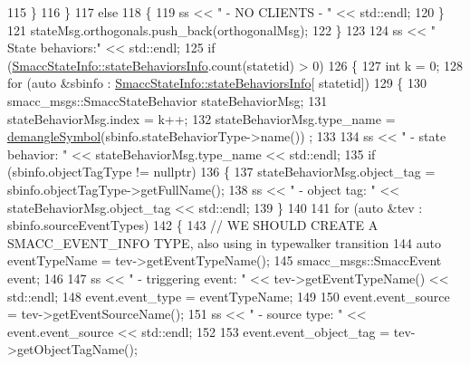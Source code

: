 \begin{DoxyCode}
115                 \}
116             \}
117             \textcolor{keywordflow}{else}
118             \{
119                 ss << \textcolor{stringliteral}{"          - NO CLIENTS - "} << std::endl;
120             \}
121             stateMsg.orthogonals.push\_back(orthogonalMsg);
122         \}
123 
124         ss << \textcolor{stringliteral}{" State behaviors:"} << std::endl;
125         \textcolor{keywordflow}{if} (\hyperlink{classsmacc_1_1introspection_1_1SmaccStateInfo_a7f62357b9ed1db5b8f9fcc3394f7f58b}{SmaccStateInfo::stateBehaviorsInfo}.count(statetid) > 0)
126         \{
127             \textcolor{keywordtype}{int} k = 0;
128             \textcolor{keywordflow}{for} (\textcolor{keyword}{auto} &sbinfo : \hyperlink{classsmacc_1_1introspection_1_1SmaccStateInfo_a7f62357b9ed1db5b8f9fcc3394f7f58b}{SmaccStateInfo::stateBehaviorsInfo}[
      statetid])
129             \{
130                 smacc\_msgs::SmaccStateBehavior stateBehaviorMsg;
131                 stateBehaviorMsg.index = k++;
132                 stateBehaviorMsg.type\_name = \hyperlink{namespacesmacc_1_1introspection_a2f495108db3e57604d8d3ff5ef030302}{demangleSymbol}(sbinfo.stateBehaviorType->name())
      ;
133 
134                 ss << \textcolor{stringliteral}{" - state behavior: "} << stateBehaviorMsg.type\_name << std::endl;
135                 \textcolor{keywordflow}{if} (sbinfo.objectTagType != \textcolor{keyword}{nullptr})
136                 \{
137                     stateBehaviorMsg.object\_tag = sbinfo.objectTagType->getFullName();
138                     ss << \textcolor{stringliteral}{"        - object tag: "} << stateBehaviorMsg.object\_tag << std::endl;
139                 \}
140 
141                 \textcolor{keywordflow}{for} (\textcolor{keyword}{auto} &tev : sbinfo.sourceEventTypes)
142                 \{
143                     \textcolor{comment}{// WE SHOULD CREATE A SMACC\_EVENT\_INFO TYPE, also using in typewalker transition}
144                     \textcolor{keyword}{auto} eventTypeName = tev->getEventTypeName();
145                     smacc\_msgs::SmaccEvent event;
146 
147                     ss << \textcolor{stringliteral}{"             - triggering event: "} << tev->getEventTypeName() << std::endl;
148                     \textcolor{keyword}{event}.event\_type = eventTypeName;
149 
150                     \textcolor{keyword}{event}.event\_source = tev->getEventSourceName();
151                     ss << \textcolor{stringliteral}{"                 - source type: "} << \textcolor{keyword}{event}.event\_source << std::endl;
152 
153                     \textcolor{keyword}{event}.event\_object\_tag = tev->getObjectTagName();

\end{DoxyCode}
